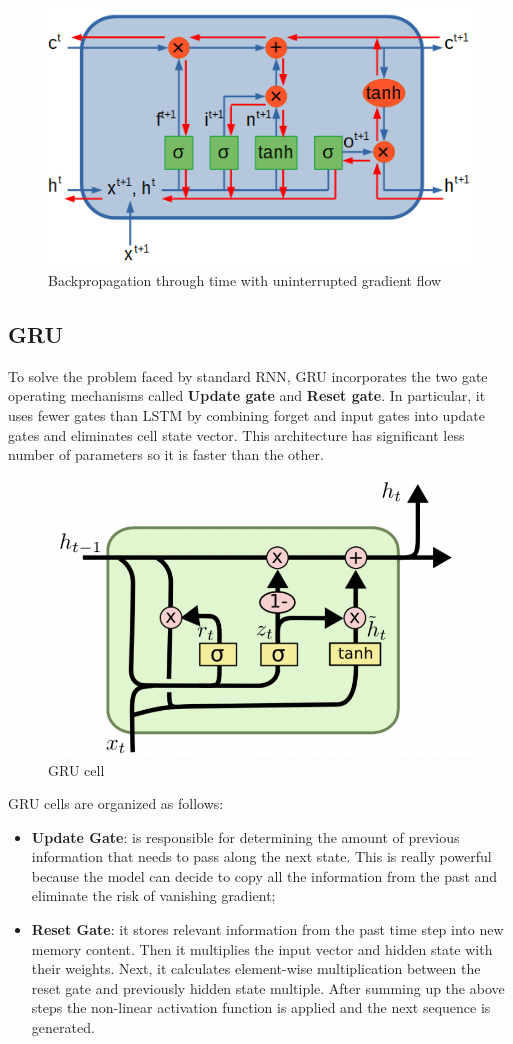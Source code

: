 \begin{figure}[!ht]
    \centering
    \includegraphics[width=0.45\linewidth]{img/RNN/backprop.png}
    \caption{Backpropagation through time with uninterrupted gradient flow}
    \label{fig:RNNBack}
\end{figure}
\subsection{GRU}
To solve the problem faced by standard RNN, GRU incorporates the two gate operating
mechanisms called \textbf{Update gate} and \textbf{Reset gate}. In particular,
it uses fewer gates than LSTM by combining forget and input gates into update gates
and eliminates cell state vector. This architecture has significant less number
of parameters so it is faster than the other.

\begin{figure}[!ht]
    \centering
    \includegraphics[width=0.45\linewidth]{img/RNN/GRU.png}
    \caption{GRU cell}
    \label{fig:gru}
\end{figure}

GRU cells are organized as follows:
\begin{itemize}
    \item \textbf{Update Gate}: is responsible for determining the amount of previous
          information that needs to pass along the next state. This is really
          powerful because the model can decide to copy all the information from
          the past and eliminate the risk of vanishing gradient;
    \item \textbf{Reset Gate}: it stores relevant information from the past time
          step into new memory content. Then it multiplies the input vector and
          hidden state with their weights. Next, it calculates element-wise
          multiplication between the reset gate and previously hidden state
          multiple. After summing up the above steps the non-linear activation
          function is applied and the next sequence is generated.
\end{itemize}